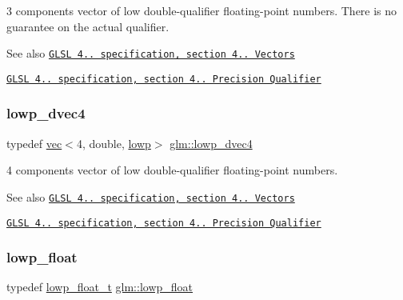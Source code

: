 3 components vector of low double-\/qualifier floating-\/point numbers. There is no guarantee on the actual qualifier.

\begin{DoxySeeAlso}{See also}
\href{http://www.opengl.org/registry/doc/GLSLangSpec.4.20.8.pdf}{\tt G\+L\+SL 4.. specification, section 4.. Vectors} 

\href{http://www.opengl.org/registry/doc/GLSLangSpec.4.20.8.pdf}{\tt G\+L\+SL 4.. specification, section 4.. Precision Qualifier} 
\end{DoxySeeAlso}
\mbox{\label{group__core__precision_gae88de6eaf7152399bdbc2687a76407c4}} 
\subsubsection{\texorpdfstring{lowp\+\_\+dvec4}{lowp\_dvec4}}
{\footnotesize\ttfamily typedef \hyperlink{structglm_1_1vec}{vec}$<$4, double, \hyperlink{namespaceglm_a36ed105b07c7746804d7fdc7cc90ff25ae161af3fc695e696ce3bf69f7332bc2d}{lowp}$>$ \hyperlink{group__core__precision_gae88de6eaf7152399bdbc2687a76407c4}{glm\+::lowp\+\_\+dvec4}}

4 components vector of low double-\/qualifier floating-\/point numbers.

\begin{DoxySeeAlso}{See also}
\href{http://www.opengl.org/registry/doc/GLSLangSpec.4.20.8.pdf}{\tt G\+L\+SL 4.. specification, section 4.. Vectors} 

\href{http://www.opengl.org/registry/doc/GLSLangSpec.4.20.8.pdf}{\tt G\+L\+SL 4.. specification, section 4.. Precision Qualifier} 
\end{DoxySeeAlso}
\mbox{\label{group__core__precision_ga2887fbc729ac5c1c5caeb7cd57a7145c}} 
\subsubsection{\texorpdfstring{lowp\+\_\+float}{lowp\_float}}
{\footnotesize\ttfamily typedef \hyperlink{namespaceglm_a0a43b64238afac063f27ee7620205bf2}{lowp\+\_\+float\+\_\+t} \hyperlink{group__core__precision_ga2887fbc729ac5c1c5caeb7cd57a7145c}{glm\+::lowp\+\_\+float}}

